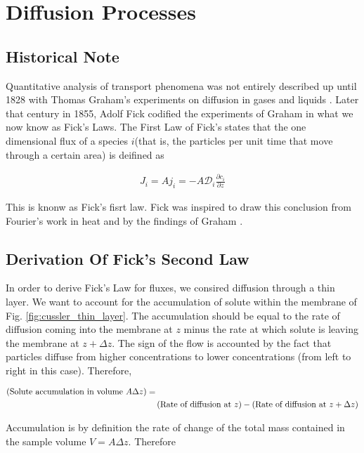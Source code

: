\section{Diffusion Processes}


\subsection{Historical Note}

\par Quantitative analysis of transport phenomena was not entirely described up until 1828 with Thomas Graham's experiments on diffusion in gases and liquids \cite{cussler}. Later that century in 1855, Adolf Fick codified the experiments of Graham in what we now know as Fick's Laws. The First Law of Fick's states that the one dimensional flux of a species $i$(that is, the particles per unit time that move through a certain area) is deifined as \cite{cussler}

\begin{align}
\label{eq:fick-fluxes}
	J_i = A j_i = -A\mathcal{D}_i\frac{\partial c_i}{\partial z} 
\end{align}

This is knonw as Fick's fisrt law. Fick was inspired to draw this conclusion from Fourier's work in heat and by the findings of Graham \cite{fick}.


\subsection{Derivation Of Fick's Second Law}

In order to derive Fick's Law for fluxes, we consired diffusion through a thin layer. We want to account for the accumulation of solute within the membrane of Fig. \ref{fig:cussler_thin_layer}. The accumulation should be equal to the rate of diffusion coming into the membrane at $z$ minus the rate at which solute is leaving the membrane at $z+\Delta z$. The sign of the flow is accounted by the fact that particles diffuse from higher concentrations to lower concentrations (from left to right in this case). Therefore,

\begin{align}
	\left({\textnormal{Solute accumulation in volume }A\Delta z}\right) =& \\&\left({\textnormal{Rate of diffusion at } z }\right) - \left({\textnormal{Rate of diffusion at } z+\Delta z}\right)
\end{align}


Accumulation is by definition the rate of change of the total mass contained in the sample volume $V = A\Delta z$. Therefore

